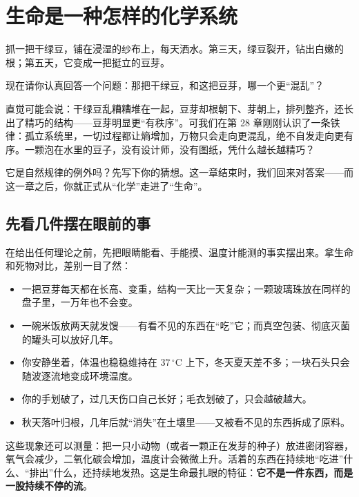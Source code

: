 \chapter{生命是一种怎样的化学系统}

\begin{kaichang}
抓一把干绿豆，铺在浸湿的纱布上，每天洒水。第三天，绿豆裂开，钻出白嫩的根；第五天，它变成一把挺立的豆芽。

现在请你认真回答一个问题：那把干绿豆，和这把豆芽，哪一个更“混乱”？

直觉可能会说：干绿豆乱糟糟堆在一起，豆芽却根朝下、芽朝上，排列整齐，还长出了精巧的结构——豆芽明显更“有秩序”。可我们在第 28 章刚刚认识了一条铁律：孤立系统里，一切过程都让熵增加，万物只会走向更混乱，绝不自发走向更有序。一颗泡在水里的豆子，没有设计师，没有图纸，凭什么越长越精巧？

它是自然规律的例外吗？先写下你的猜想。这一章结束时，我们回来对答案——而这一章之后，你就正式从“化学”走进了“生命”。
\end{kaichang}

\section{先看几件摆在眼前的事}

在给出任何理论之前，先把眼睛能看、手能摸、温度计能测的事实摆出来。拿生命和死物对比，差别一目了然：

\begin{itemize}[itemsep=2pt]
\item 一把豆芽每天都在长高、变重，结构一天比一天复杂；一颗玻璃珠放在同样的盘子里，一万年也不会变。
\item 一碗米饭放两天就发馊——有看不见的东西在“吃”它；而真空包装、彻底灭菌的罐头可以放好几年。
\item 你安静坐着，体温也稳稳维持在 $37\,^{\circ}\mathrm{C}$ 上下，冬天夏天差不多；一块石头只会随波逐流地变成环境温度。
\item 你的手划破了，过几天伤口自己长好；毛衣划破了，只会越破越大。
\item 秋天落叶归根，几年后就“消失”在土壤里——又被看不见的东西拆成了原料。
\end{itemize}

这些现象还可以测量：把一只小动物（或者一颗正在发芽的种子）放进密闭容器，氧气会减少，二氧化碳会增加，温度计会微微上升。活着的东西在持续地“吃进”什么、“排出”什么，还持续地发热。这是生命最扎眼的特征：\textbf{它不是一件东西，而是一股持续不停的流}。

